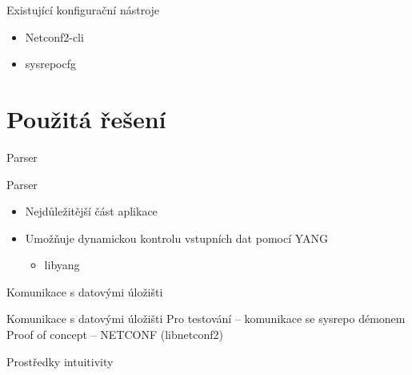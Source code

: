 \documentclass[czech,aspectratio=169]{beamer}
\begin{document}
\begin{frame}{Existující konfigurační nástroje}
\begin{itemize}
\pause{}
\item Netconf2-cli
\item sysrepocfg
\end{itemize}
\end{frame}

\section{Použitá řešení}

\begin{frame}[plain]
\begin{center}
\color{CVUT}
\Large Parser
\end{center}
\end{frame}

\begin{frame}{Parser}
\begin{itemize}
    \item[] Nejdůležitější část aplikace
    \item[] Umožňuje dynamickou kontrolu vstupních dat pomocí YANG \pause{}
        \begin{itemize}
            \item libyang
        \end{itemize}
\end{itemize}
\end{frame}

\begin{frame}[plain]
\begin{center}
\color{CVUT}
\Large Komunikace s datovými úložišti
\end{center}
\end{frame}


\begin{frame}{Komunikace s datovými úložišti}
    \pause{}
    Pro testování -- komunikace se sysrepo démonem
    \pause{}
    \vfill
    Proof of concept -- NETCONF (libnetconf2)

\end{frame}

\begin{frame}[plain]
\begin{center}
\color{CVUT}
\Large Prostředky intuitivity
\end{center}
\end{frame}
\end{document}
